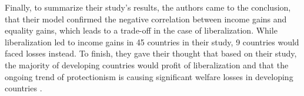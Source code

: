 Finally, to summarize their study's results, the authors came to the conclusion, that their model confirmed the negative
correlation between income gains and equality gains, which leads to a trade-off in the case of liberalization. While liberalization
led to income gains in 45 countries in their study, 9 countries would faced losses instead. To finish, they gave their thought that
based on their study, the majority of developing countries would profit of liberalization and that the ongoing trend of protectionism
is causing significant welfare losses in developing countries \parencite[p.~30]{Artuc.2019}. 
